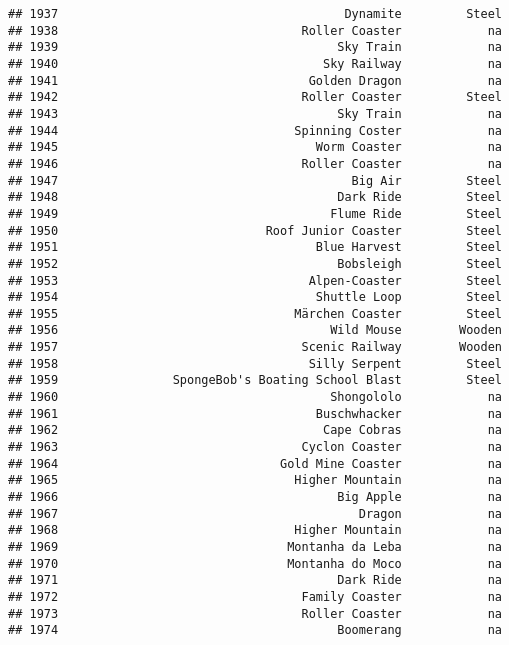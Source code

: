 \documentclass[
]{article}
\begin{document}
\begin{verbatim}
## 1937                                        Dynamite         Steel
## 1938                                  Roller Coaster            na
## 1939                                       Sky Train            na
## 1940                                     Sky Railway            na
## 1941                                   Golden Dragon            na
## 1942                                  Roller Coaster         Steel
## 1943                                       Sky Train            na
## 1944                                 Spinning Coster            na
## 1945                                    Worm Coaster            na
## 1946                                  Roller Coaster            na
## 1947                                         Big Air         Steel
## 1948                                       Dark Ride         Steel
## 1949                                      Flume Ride         Steel
## 1950                             Roof Junior Coaster         Steel
## 1951                                    Blue Harvest         Steel
## 1952                                       Bobsleigh         Steel
## 1953                                   Alpen-Coaster         Steel
## 1954                                    Shuttle Loop         Steel
## 1955                                 Märchen Coaster         Steel
## 1956                                      Wild Mouse        Wooden
## 1957                                  Scenic Railway        Wooden
## 1958                                   Silly Serpent         Steel
## 1959                SpongeBob's Boating School Blast         Steel
## 1960                                      Shongololo            na
## 1961                                    Buschwhacker            na
## 1962                                     Cape Cobras            na
## 1963                                  Cyclon Coaster            na
## 1964                               Gold Mine Coaster            na
## 1965                                 Higher Mountain            na
## 1966                                       Big Apple            na
## 1967                                          Dragon            na
## 1968                                 Higher Mountain            na
## 1969                                Montanha da Leba            na
## 1970                                Montanha do Moco            na
## 1971                                       Dark Ride            na
## 1972                                  Family Coaster            na
## 1973                                  Roller Coaster            na
## 1974                                       Boomerang            na

\end{verbatim}
\end{document}
